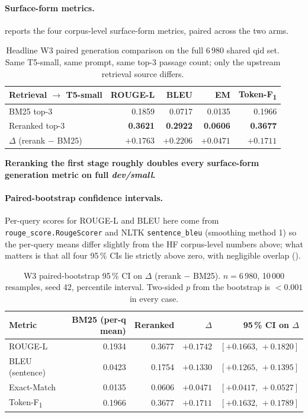 \documentclass[11pt,a4paper]{article}
\newcommand{\devsmall}{\textit{dev/small}}
\newcommand{\fdev}{6\,980}
\newcommand{\F}{F\textsubscript{1}}
\newcommand{\Tokenf}{Token-\F}
\newcommand{\rougel}{ROUGE-L}
\newcommand{\bmtwofive}{BM25}
\begin{document}
\paragraph{Surface-form metrics.}   reports
the four corpus-level surface-form metrics, paired across the two
arms.

\begin{table}[H]
  \centering
  \caption{Headline W3 paired generation comparison on the full
  \fdev{} shared qid set.  Same T5-small, same prompt, same top-3
  passage count; only the upstream retrieval source differs.}
  \label{tab:w3-headline}
  \begin{tabular}{lrrrr}
    \toprule
    Retrieval $\to$ T5-small & \rougel{} & BLEU & EM & \Tokenf{} \\
    \midrule
    \bmtwofive{} top-3       & 0.1859 & 0.0717 & 0.0135 & 0.1966 \\
    Reranked top-3           & \textbf{0.3621} & \textbf{0.2922} & \textbf{0.0606} & \textbf{0.3677} \\
    $\Delta$ (rerank $-$ \bmtwofive{}) & $\mathbf{+0.1763}$ & $\mathbf{+0.2206}$ & $\mathbf{+0.0471}$ & $\mathbf{+0.1711}$ \\
    \bottomrule
  \end{tabular}
\end{table}

\textbf{Reranking the first stage roughly doubles every
surface-form generation metric on full \devsmall{}.}

\paragraph{Paired-bootstrap confidence intervals.}  Per-query scores
for \rougel{} and BLEU here come from \texttt{rouge\_score.RougeScorer}
and NLTK \texttt{sentence\_bleu} (smoothing method 1) so the
per-query means differ slightly from the HF corpus-level numbers
above; what matters is that all four 95\,\% CIs lie strictly above
zero, with negligible overlap ().

\begin{table}[H]
  \centering
  \caption{W3 paired-bootstrap 95\,\% CI on $\Delta$ (rerank $-$
  \bmtwofive{}).  $n\!=\!\fdev$, 10\,000 resamples, seed 42, percentile
  interval.  Two-sided $p$ from the bootstrap is $<\!0.001$ in every
  case.}
  \label{tab:w3-ci}
  \begin{tabular}{lrrrr}
    \toprule
    Metric            & \bmtwofive{} (per-q mean) & Reranked & $\Delta$ & 95\,\% CI on $\Delta$ \\
    \midrule
    \rougel{}         & 0.1934 & 0.3677 & $+0.1742$ & $[+0.1663,\,+0.1820]$ \\
    BLEU (sentence)   & 0.0423 & 0.1754 & $+0.1330$ & $[+0.1265,\,+0.1395]$ \\
    Exact-Match       & 0.0135 & 0.0606 & $+0.0471$ & $[+0.0417,\,+0.0527]$ \\
    \Tokenf{}         & 0.1966 & 0.3677 & $+0.1711$ & $[+0.1632,\,+0.1789]$ \\
    \bottomrule
  \end{tabular}
\end{table}
\end{document}
